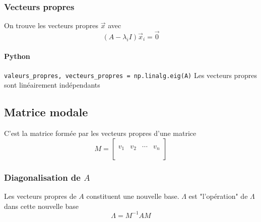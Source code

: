 \documentclass[resume]{subfiles}
\begin{document}
\subsubsection{Vecteurs propres}
On trouve les vecteurs propres $\vec{x}$ avec
$$\left(A-\lambda_i I\right)\vec{x}_i=\vec{0}$$
\paragraph{Python} \verb!valeurs_propres, vecteurs_propres = np.linalg.eig(A)!
Les vecteurs propres sont linéairement indépendants
\subsection{Matrice modale}
C'est la matrice formée par les vecteurs propres d'une matrice
$$M=\begin{bmatrix}
\\
v_1 & v_2 & \cdots & v_n\\
\\
\end{bmatrix}$$
\subsubsection{Diagonalisation de $A$}
Les vecteurs propres de $A$ constituent une nouvelle base. $\Lambda$ est "l'opération" de $\Lambda$ dans cette nouvelle base
$$\Lambda=M^{-1}AM$$
\end{document}
